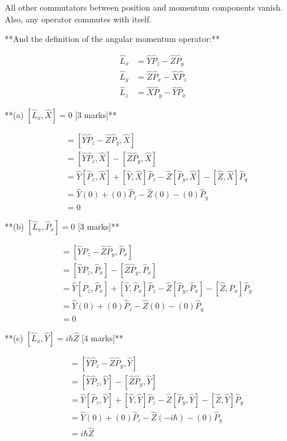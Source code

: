\documentclass{article}
\begin{document}
All other commutators between position and momentum components vanish.  Also, any operator commutes with itself.

**And the definition of the angular momentum operator:**

\begin{align*}
\hat{L}_x &= \hat{Y}\hat{P}_z - \hat{Z}\hat{P}_y \\
\hat{L}_y &= \hat{Z}\hat{P}_x - \hat{X}\hat{P}_z \\
\hat{L}_z &= \hat{X}\hat{P}_y - \hat{Y}\hat{P}_x
\end{align*}


**(a) $\left[\hat{L}_x, \hat{X}\right] = 0$  [3 marks]**

\begin{align*}
[\hat{L}_x, \hat{X}] &= [\hat{Y}\hat{P}_z - \hat{Z}\hat{P}_y, \hat{X}] \\
&= [\hat{Y}\hat{P}_z, \hat{X}] - [\hat{Z}\hat{P}_y, \hat{X}] \\
&= \hat{Y}[\hat{P}_z, \hat{X}] + [\hat{Y}, \hat{X}]\hat{P}_z - \hat{Z}[\hat{P}_y, \hat{X}] - [\hat{Z}, \hat{X}]\hat{P}_y \\
&= \hat{Y}(0) + (0)\hat{P}_z - \hat{Z}(0) - (0)\hat{P}_y \\
&= 0 
\end{align*}

**(b) $\left[\hat{L}_x, \hat{P}_x\right] = 0$ [3 marks]**

\begin{align*}
[\hat{L}_x, \hat{P}_x] &= [\hat{Y}\hat{P}_z - \hat{Z}\hat{P}_y, \hat{P}_x] \\
&= [\hat{Y}\hat{P}_z, \hat{P}_x] - [\hat{Z}\hat{P}_y, \hat{P}_x] \\
&= \hat{Y}[\hat{P}_z, \hat{P}_x] + [\hat{Y}, \hat{P}_x]\hat{P}_z - \hat{Z}[\hat{P}_y, \hat{P}_x] - [\hat{Z}, \hat{P}_x]\hat{P}_y \\
&= \hat{Y}(0) + (0)\hat{P}_z - \hat{Z}(0) - (0)\hat{P}_y \\
&= 0
\end{align*}

**(c) $\left[\hat{L}_x, \hat{Y}\right] = i\hbar \hat{Z}$ [4 marks]**

\begin{align*}
[\hat{L}_x, \hat{Y}] &= [\hat{Y}\hat{P}_z - \hat{Z}\hat{P}_y, \hat{Y}] \\
&= [\hat{Y}\hat{P}_z, \hat{Y}] - [\hat{Z}\hat{P}_y, \hat{Y}] \\
&= \hat{Y}[\hat{P}_z, \hat{Y}] + [\hat{Y}, \hat{Y}]\hat{P}_z - \hat{Z}[\hat{P}_y, \hat{Y}] - [\hat{Z}, \hat{Y}]\hat{P}_y \\
&= \hat{Y}(0) + (0)\hat{P}_z - \hat{Z}(-i\hbar) - (0)\hat{P}_y \\
&= i\hbar \hat{Z}
\end{align*}
\end{document}
